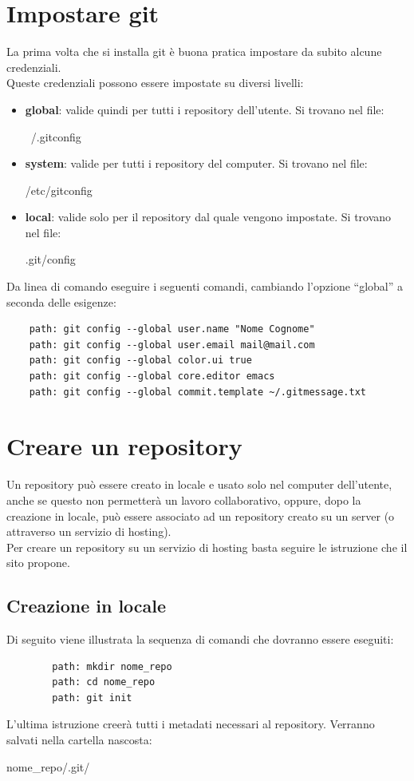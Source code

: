 \section{Impostare git} %
\label{sec:impostare_git}
La prima volta che si installa git è buona pratica impostare da subito alcune credenziali. \\
Queste credenziali possono essere impostate su diversi livelli:
	\begin{itemize}
		\item \textbf{global}: valide quindi per tutti i repository dell'utente. Si trovano nel file:
			\begin{center}
				~/.gitconfig
			\end{center}
		\item \textbf{system}: valide per tutti i repository del computer. Si trovano nel file:
			\begin{center}
				/etc/gitconfig
			\end{center}
		\item \textbf{local}: valide solo per il repository dal quale vengono impostate. Si trovano nel file:
			\begin{center}
				.git/config
			\end{center}
	\end{itemize}
Da linea di comando eseguire i seguenti comandi, cambiando l'opzione ``global'' a seconda delle esigenze:
	\begin{verbatim}
	path: git config --global user.name "Nome Cognome"
	path: git config --global user.email mail@mail.com
	path: git config --global color.ui true
	path: git config --global core.editor emacs
	path: git config --global commit.template ~/.gitmessage.txt
	\end{verbatim}


\newpage \clearpage
\section{Creare un repository} %
\label{sec:creare_un_repository}
Un repository può essere creato in locale e usato solo nel computer dell'utente, anche se questo non permetterà un lavoro collaborativo, oppure, dopo la creazione in locale, può essere associato ad un repository creato su un server (o attraverso un servizio di hosting). \\
Per creare un repository su un servizio di hosting basta seguire le istruzione che il sito propone.
	\subsection{Creazione in locale} %
	\label{sub:creazione_in_locale}
	Di seguito viene illustrata la sequenza di comandi che dovranno essere eseguiti:
		\begin{verbatim}
		path: mkdir nome_repo
		path: cd nome_repo
		path: git init
		\end{verbatim}
	\noindent
	L'ultima istruzione creerà tutti i metadati necessari al repository. Verranno salvati nella cartella nascosta:
		\begin{center}
			nome\_repo/.git/
		\end{center}

